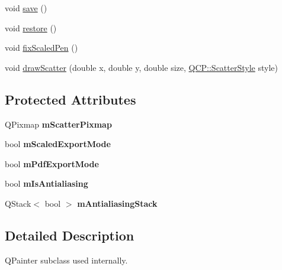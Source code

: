 \begin{DoxyCompactItemize}
\item 
void \hyperlink{classQCPPainter_a8fd6821ee6fecbfa04444c9062912abd}{save} ()
\item 
void \hyperlink{classQCPPainter_a64908e6298d5bbd83457dc987cc3a022}{restore} ()
\item 
void \hyperlink{classQCPPainter_a27af07a62c335faf79191b797306b218}{fix\-Scaled\-Pen} ()
\item 
void \hyperlink{classQCPPainter_a3aa145eb9865752d583c40ef995c5049}{draw\-Scatter} (double x, double y, double size, \hyperlink{namespaceQCP_af66d0711d42fe78d96c28abadc67f26f}{Q\-C\-P\-::\-Scatter\-Style} style)
\end{DoxyCompactItemize}
\subsection*{Protected Attributes}
\begin{DoxyCompactItemize}
\item 
\hypertarget{classQCPPainter_a20d67229e0977ad7ce3a3c7349cbd59c}{Q\-Pixmap {\bfseries m\-Scatter\-Pixmap}}\label{classQCPPainter_a20d67229e0977ad7ce3a3c7349cbd59c}

\item 
\hypertarget{classQCPPainter_a967991f4d003d1fca9f67d9152ef651e}{bool {\bfseries m\-Scaled\-Export\-Mode}}\label{classQCPPainter_a967991f4d003d1fca9f67d9152ef651e}

\item 
\hypertarget{classQCPPainter_ab73675954590388f0e170e6bc70efe2a}{bool {\bfseries m\-Pdf\-Export\-Mode}}\label{classQCPPainter_ab73675954590388f0e170e6bc70efe2a}

\item 
\hypertarget{classQCPPainter_a7055085da176aee0f6b23298f1003d08}{bool {\bfseries m\-Is\-Antialiasing}}\label{classQCPPainter_a7055085da176aee0f6b23298f1003d08}

\item 
\hypertarget{classQCPPainter_a0189e641bbf7dc31ac15aef7b36501fa}{Q\-Stack$<$ bool $>$ {\bfseries m\-Antialiasing\-Stack}}\label{classQCPPainter_a0189e641bbf7dc31ac15aef7b36501fa}

\end{DoxyCompactItemize}


\subsection{Detailed Description}
Q\-Painter subclass used internally. 

